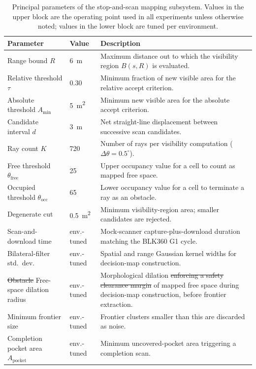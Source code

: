 \documentclass[sensors,article,submit,pdftex,moreauthors]{Definitions/mdpi}
\providecommand{\DIFadd}[1]{{\protect\color{blue} \sf #1}} %
\providecommand{\DIFdel}[1]{{\protect\color{red}\protect\scriptsize\protect\sout{#1}}} %
\providecommand{\DIFaddFL}[1]{\DIFadd{#1}} %
\providecommand{\DIFdelFL}[1]{\DIFdel{#1}} %
\providecommand{\DIFaddbeginFL}{} %
\providecommand{\DIFaddendFL}{} %
\providecommand{\DIFdelbeginFL}{} %
\providecommand{\DIFdelendFL}{} %
\begin{document}
\begin{table}[H]
\caption{Principal parameters of the stop-and-scan mapping subsystem. Values in
the upper block are the operating point used in all experiments unless otherwise
noted; values in the lower block are tuned per environment.}
\label{tab:params}
\begin{tabularx}{\linewidth}{l l P}
\toprule
\textbf{Parameter} & \textbf{Value} & \textbf{Description} \\
\midrule
Range bound $R$              & 6~m   & Maximum distance out to which the visibility region $B(s,R)$ is evaluated. \\
Relative threshold $\tau$    & 0.30  & Minimum fraction of new visible area for the relative accept criterion. \\
Absolute threshold $A_{\min}$& 5~m\textsuperscript{2} & Minimum new visible area for the absolute accept criterion. \\
Candidate interval $d$       & 3~m   & Net straight-line displacement between successive scan candidates. \\
Ray count $K$                & 720   & Number of rays per visibility computation ($\Delta\theta=0.5^\circ$). \\
Free threshold $\theta_{\mathrm{free}}$ & 25 & Upper occupancy value for a cell to count as mapped free space. \\
Occupied threshold $\theta_{\mathrm{occ}}$ & 65 & Lower occupancy value for a cell to terminate a ray as an obstacle. \\
Degenerate cut               & 0.5~m\textsuperscript{2} & Minimum visibility-region area; smaller candidates are rejected. \\
\midrule
Scan-and-download time       & env.-tuned & Mock-scanner capture-plus-download duration matching the BLK360 G1 cycle. \\
Bilateral-filter std.\ dev.  & env.-tuned & Spatial and range Gaussian kernel widths for decision-map construction. \\
\DIFdelbeginFL \DIFdelFL{Obstacle }\DIFdelendFL \DIFaddbeginFL \DIFaddFL{Free-space }\DIFaddendFL dilation radius   & env.-tuned & Morphological dilation \DIFdelbeginFL \DIFdelFL{enforcing a safety clearance margin}\DIFdelendFL \DIFaddbeginFL \DIFaddFL{of mapped free space during decision-map construction, before frontier extraction}\DIFaddendFL . \\
Minimum frontier size        & env.-tuned & Frontier clusters smaller than this are discarded as noise. \\
Completion pocket area $A_{\mathrm{pocket}}$ & env.-tuned & Minimum uncovered-pocket area triggering a completion scan. \\
\bottomrule
\end{tabularx}
\end{table}
\end{document}
